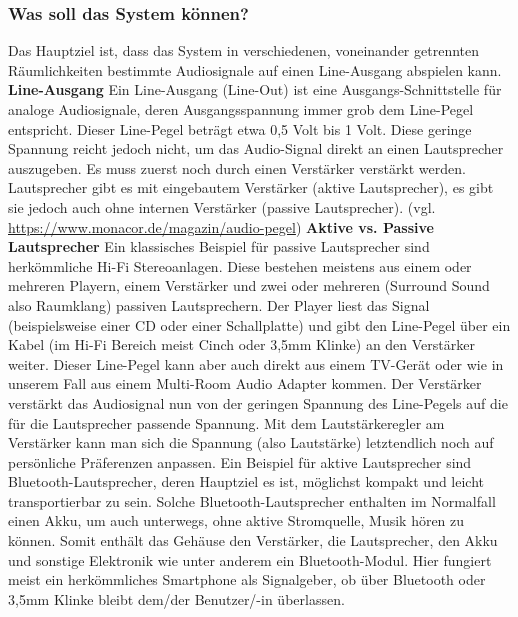 \documentclass[11pt, twoside]{article}
\begin{document}
\subsubsection{Was soll das System können?}
Das Hauptziel ist, dass das System in verschiedenen, voneinander getrennten Räumlichkeiten bestimmte Audiosignale auf einen Line-Ausgang abspielen kann.
\vspace{4mm}\newline
\textbf{Line-Ausgang}\newline
Ein Line-Ausgang (Line-Out) ist eine Ausgangs-Schnittstelle für analoge Audiosignale, deren Ausgangsspannung immer grob dem Line-Pegel entspricht. Dieser \glqq Line-Pegel beträgt etwa 0,5 Volt bis 1 Volt\grqq{}. \newline
Diese geringe Spannung reicht jedoch nicht, um das Audio-Signal direkt an einen Lautsprecher auszugeben. Es muss zuerst noch durch einen Verstärker verstärkt werden. Lautsprecher gibt es mit eingebautem Verstärker (aktive Lautsprecher), es gibt sie jedoch auch ohne internen Verstärker (passive Lautsprecher).
\vspace{4mm}\newline
(vgl. \url{https://www.monacor.de/magazin/audio-pegel})
\vspace{4mm}\newline
\textbf{Aktive vs. Passive Lautsprecher}\newline
Ein klassisches Beispiel für passive Lautsprecher sind herkömmliche Hi-Fi Stereoanlagen. Diese bestehen meistens aus einem oder mehreren Playern, einem Verstärker und zwei oder mehreren (Surround Sound also Raumklang) passiven Lautsprechern. Der Player liest das Signal (beispielsweise einer CD oder einer Schallplatte) und gibt den Line-Pegel über ein Kabel (im Hi-Fi Bereich meist Cinch oder 3,5mm Klinke) an den Verstärker weiter. Dieser Line-Pegel kann aber auch direkt aus einem TV-Gerät oder wie in unserem Fall aus einem Multi-Room Audio Adapter kommen. Der Verstärker verstärkt das Audiosignal nun von der geringen Spannung des Line-Pegels auf die für die Lautsprecher passende Spannung. Mit dem Lautstärkeregler am Verstärker kann man sich die Spannung (also Lautstärke) letztendlich noch auf persönliche Präferenzen anpassen. \newline
Ein Beispiel für aktive Lautsprecher sind Bluetooth-Lautsprecher, deren Hauptziel es ist, möglichst kompakt und leicht transportierbar zu sein. Solche Bluetooth-Lautsprecher enthalten im Normalfall einen Akku, um auch unterwegs, ohne aktive Stromquelle, Musik hören zu können. Somit enthält das Gehäuse den Verstärker, die Lautsprecher, den Akku und sonstige Elektronik wie unter anderem ein Bluetooth-Modul. Hier fungiert meist ein herkömmliches Smartphone als Signalgeber, ob über Bluetooth oder 3,5mm Klinke bleibt dem/der Benutzer/-in überlassen.\newline
\end{document}
